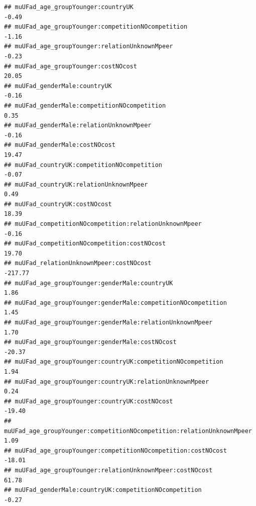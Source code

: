 \documentclass[
]{article}
\begin{document}
\begin{verbatim}
## muUFad_age_groupYounger:countryUK                                                               -0.49
## muUFad_age_groupYounger:competitionNOcompetition                                                -1.16
## muUFad_age_groupYounger:relationUnknownMpeer                                                    -0.23
## muUFad_age_groupYounger:costNOcost                                                              20.05
## muUFad_genderMale:countryUK                                                                     -0.16
## muUFad_genderMale:competitionNOcompetition                                                       0.35
## muUFad_genderMale:relationUnknownMpeer                                                          -0.16
## muUFad_genderMale:costNOcost                                                                    19.47
## muUFad_countryUK:competitionNOcompetition                                                       -0.07
## muUFad_countryUK:relationUnknownMpeer                                                            0.49
## muUFad_countryUK:costNOcost                                                                     18.39
## muUFad_competitionNOcompetition:relationUnknownMpeer                                            -0.16
## muUFad_competitionNOcompetition:costNOcost                                                      19.70
## muUFad_relationUnknownMpeer:costNOcost                                                        -217.77
## muUFad_age_groupYounger:genderMale:countryUK                                                     1.86
## muUFad_age_groupYounger:genderMale:competitionNOcompetition                                      1.45
## muUFad_age_groupYounger:genderMale:relationUnknownMpeer                                          1.70
## muUFad_age_groupYounger:genderMale:costNOcost                                                  -20.37
## muUFad_age_groupYounger:countryUK:competitionNOcompetition                                       1.94
## muUFad_age_groupYounger:countryUK:relationUnknownMpeer                                           0.24
## muUFad_age_groupYounger:countryUK:costNOcost                                                   -19.40
## muUFad_age_groupYounger:competitionNOcompetition:relationUnknownMpeer                            1.09
## muUFad_age_groupYounger:competitionNOcompetition:costNOcost                                    -18.01
## muUFad_age_groupYounger:relationUnknownMpeer:costNOcost                                         61.78
## muUFad_genderMale:countryUK:competitionNOcompetition                                            -0.27

\end{verbatim}
\end{document}
